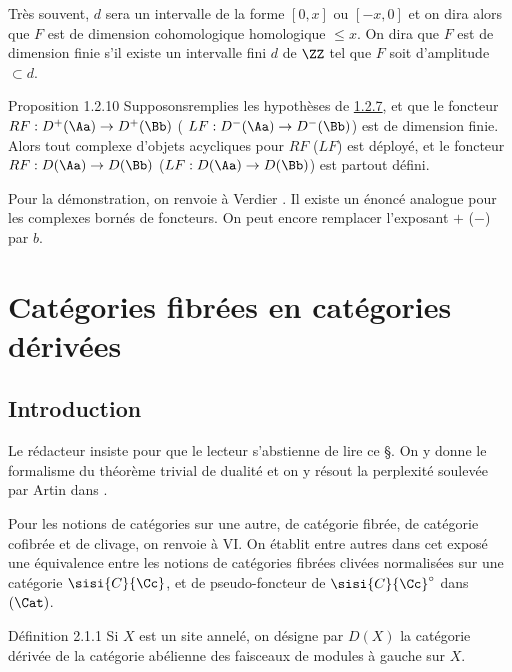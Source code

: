 \documentclass[10pt]{../fichiers-configuration-latex/smfart}
\begin{document}
Très souvent, $d$ sera un intervalle de la forme $[0,x]$ ou $[-x,0]$
et on dira alors que $F$ est de dimension cohomologique \resp
homologique $\leq x$. On dira que $F$ est de dimension finie s'il
existe un intervalle fini $d$ de $\ZZ$ tel que $F$ soit
d'amplitude $\subset d$.

\begin{enonce*}{Proposition 1.2.10}
Supposons\pageoriginale remplies les hypothèses de \hyperref[XVII.prop1.2.7]{1.2.7}, et que le
foncteur $RF:D^{+}(\Aa)\rightarrow D^{+}(\Bb)$ (\resp
$LF:D^{-}(\Aa)\rightarrow D^{-}(\Bb)$) est de
dimension finie. Alors tout complexe d'objets acycliques pour $RF$
(\resp $LF$) est déployé, et le foncteur $RF:D(\Aa)\rightarrow
D(\Bb)$ (\resp $LF:D(\Aa)\rightarrow D(\Bb)$) est partout défini.
\end{enonce*}

Pour la démonstration, on renvoie à Verdier \cite{SGA4-17:CD}. Il existe un énoncé
analogue pour les complexes bornés de foncteurs. On peut encore
remplacer l'exposant $+$ (\resp $-$) par $b$.

\section{Catégories fibrées en catégories dérivées}

\subsection{Introduction}

Le rédacteur insiste pour que le lecteur s'abstienne de lire ce \S. On
y donne le formalisme du théorème trivial de dualité et on y
résout la perplexité soulevée par Artin dans .

Pour les notions de catégories sur une autre, de catégorie fibrée, de
catégorie cofibrée et de clivage, on renvoie à  VI. On établit
entre autres dans cet exposé une équivalence entre les notions de
catégories fibrées clivées normalisées sur une catégorie $\sisi{C}{\Cc}$, et de
pseudo-foncteur de $\sisi{C}{\Cc}^{\circ}$ dans $(\Cat)$.

\begin{enonce*}{Définition 2.1.1}
Si $X$ est un site annelé, on désigne par $D(X)$ la catégorie dérivée
de la catégorie abélienne des faisceaux de modules à gauche sur $X$.
\end{enonce*}
\end{document}
